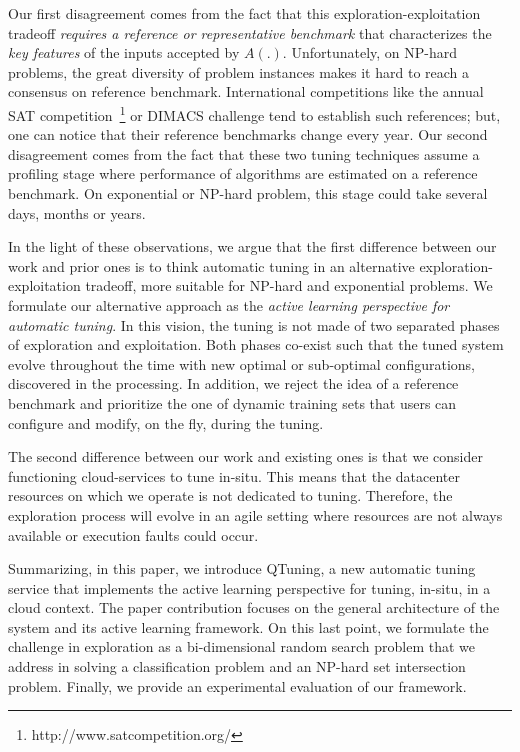 \documentclass[10pt, conference, compsocconf]{IEEEtran}
\begin{document}
Our first disagreement comes from the fact that this exploration-exploitation tradeoff {\it requires a reference or representative
benchmark} that characterizes the {\it key features} of the inputs accepted by  $A(.)$. Unfortunately, on NP-hard problems, the great
diversity of problem instances makes it hard to reach a consensus on reference benchmark. International competitions like the annual SAT
competition~\footnote{http://www.satcompetition.org/} or DIMACS challenge tend to establish such references; but, one can notice
that their reference benchmarks change every year.
Our second disagreement comes from the fact that these two tuning techniques assume a profiling stage where performance of
algorithms are estimated on a reference benchmark. On exponential or NP-hard problem, this stage could take several days,
months or years.


In the light of these observations, we argue that the first difference between our work and prior ones is to think
automatic tuning in an alternative exploration-exploitation tradeoff, more suitable for NP-hard and exponential problems.
We formulate our alternative approach as the {\it active learning perspective for automatic tuning}.
In this vision, the tuning is not made of two separated phases of exploration and exploitation. Both phases co-exist
such that the tuned system evolve throughout the time with new optimal or sub-optimal configurations, discovered in the processing.
In addition, we reject the idea of a reference benchmark and prioritize the one of dynamic training sets that users
can configure and modify, on the fly, during the tuning.

The second difference between our work and existing ones is that we consider functioning cloud-services to tune in-situ.
This means that the datacenter resources on which we operate is not dedicated to tuning. Therefore, the exploration process will
evolve in an agile setting where resources are not always available or execution faults could occur.

Summarizing, in this paper, we introduce QTuning, a new automatic tuning service that implements the active
learning perspective for tuning, in-situ, in a cloud context. The paper contribution focuses on the general
architecture of the system and its active learning framework. On this last point, we formulate the challenge in
exploration as a bi-dimensional random search problem that we address in solving a classification problem and
an NP-hard set intersection problem.  Finally, we provide an experimental evaluation of our framework.
\end{document}
